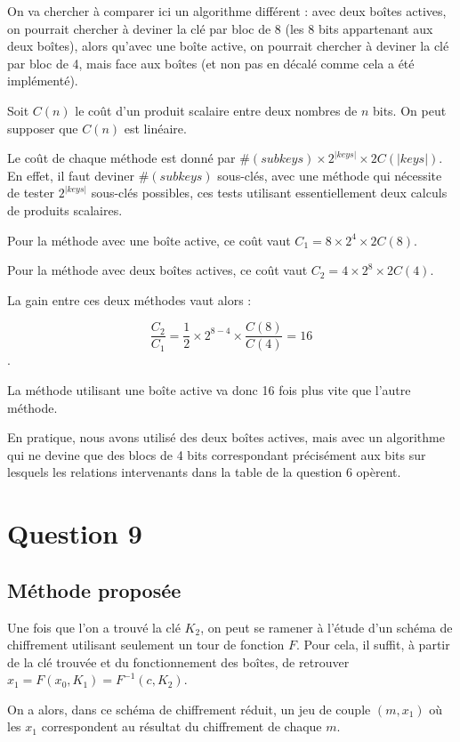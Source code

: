 On va chercher à comparer ici un algorithme différent : avec deux boîtes actives, on pourrait chercher à deviner la clé par bloc de 8 (les 8 bits appartenant aux deux boîtes), alors qu'avec une boîte active, on pourrait chercher à deviner la clé par bloc de 4, mais face aux boîtes (et non pas en décalé comme cela a été implémenté).

Soit $C(n)$ le coût d'un produit scalaire entre deux nombres de $n$ bits. On peut supposer que $C(n)$ est linéaire.

Le coût de chaque méthode est donné par $ \# (subkeys) \times 2^{ | keys |} \times 2 C( |keys|)$. En effet, il faut deviner $\# (subkeys)$ sous-clés, avec une méthode qui nécessite de tester $2^{ | keys |}$ sous-clés possibles, ces tests utilisant essentiellement deux calculs de produits scalaires.

Pour la méthode avec une boîte active, ce coût vaut $C_1 = 8 \times 2^4 \times 2 C(8)$. 

Pour la méthode avec deux boîtes actives, ce coût vaut $C_2 = 4 \times 2^8 \times 2 C(4)$.

La gain entre ces deux méthodes vaut alors :

$$ \frac{C_2}{C_1} = \frac{1}{2} \times 2^{8-4} \times \frac{C(8)}{C(4)} = 16$$.

La méthode utilisant une boîte active va donc 16 fois plus vite que l'autre méthode.

En pratique, nous avons utilisé des deux boîtes actives, mais avec un algorithme qui ne devine que des blocs de 4 bits correspondant précisément aux bits sur lesquels les relations intervenants dans la table de la question 6 opèrent.

\section*{Question 9}

\subsection*{Méthode proposée}

Une fois que l'on a trouvé la clé $K_2$, on peut se ramener à l'étude d'un schéma de chiffrement utilisant seulement un tour de fonction $F$. Pour cela, il suffit, à partir de la clé trouvée et du fonctionnement des boîtes, de retrouver $x_1 = F(x_0,K_1) = F^{-1}(c,K_2)$.

On a alors, dans ce schéma de chiffrement réduit, un jeu de couple $(m,x_1)$ où les $x_1$ correspondent au résultat du chiffrement de chaque $m$.

